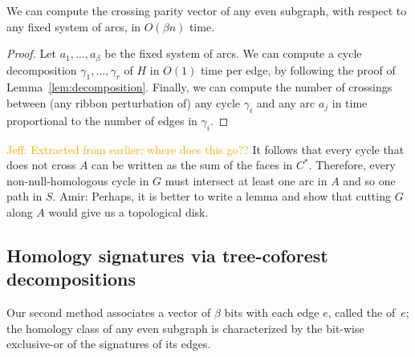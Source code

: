 \documentclass[letterpaper,review]{siamart190516}
\def\Z{\mathbb{Z}}
\def\modified#1{\color{blue}#1 \color{black}}
\def\anote#1{\color{purple}Amir: #1 \color{black}}
\def\jnote#1{\textcolor{orange}{Jeff: #1}}
\def\enote#1{\textcolor{magenta}{Erin: #1}}
\begin{document}

\begin{lemma}
We can compute the crossing parity vector of any even subgraph, with respect to any fixed system of arcs, in $O(\beta n)$ time.
\end{lemma}

\begin{proof}
Let $a_1,\dots, a_\beta$ be the fixed system of arcs. 
We can compute a cycle decomposition $\gamma_1, \dots, \gamma_r$ of $H$ in $O(1)$ time per edge, by following the proof of Lemma~\ref{lem:decomposition}.  Finally, we can compute the number of crossings between (any ribbon perturbation of) any cycle $\gamma_i$ and any arc $a_j$ in time proportional to the number of edges in $\gamma_i$.
\end{proof}

\jnote{Extracted from earlier; where does this go??}
It follows that every cycle that does not cross $A$ can be written as the sum of the faces in $C^*$.
Therefore, every non-null-homologous cycle in $G$ must intersect at least one arc in $A$ and so one path in $S$. \anote{Perhaps, it is better to write a lemma and show that cutting $G$ along $A$ would give us a topological disk.}




\subsection{Homology signatures via tree-coforest decompositions}
\label{sec:characterizing_signatures}

Our second method associates a vector of $\beta$ bits with each edge $e$, called the  of~$e$; the homology class of any even subgraph is characterized by the bit-wise exclusive-or of the signatures of its edges.
\end{document}
